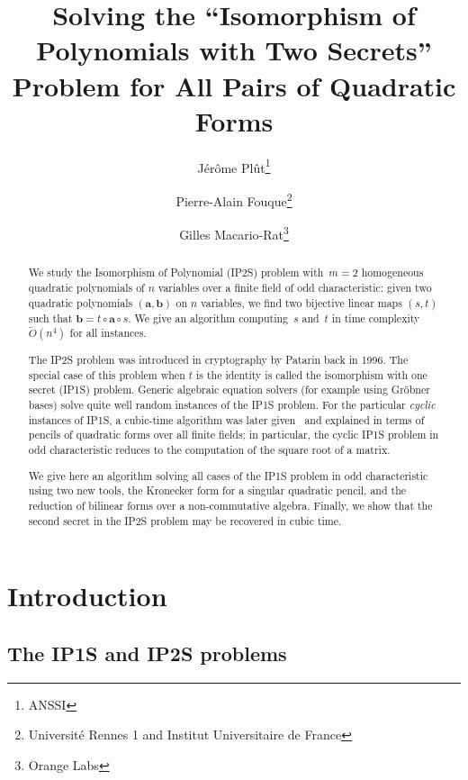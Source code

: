 \documentclass{article}%
\def\Ot{\widetilde{O}}
\begin{document}
\title%
{Solving the ``Isomorphism of Polynomials with Two Secrets'' Problem
for All Pairs of Quadratic Forms}%
\author{Jérôme Plût\footnote{ANSSI}
\and Pierre-Alain Fouque\footnote{Université Rennes 1 and Institut
Universitaire de France}
\and Gilles Macario-Rat\footnote{Orange Labs}}
\maketitle

\begin{abstract}%
We study the Isomorphism of Polynomial (IP2S) problem
with~$m=2$ homogeneous quadratic polynomials of $n$ variables over a finite field of odd
characteristic: given two quadratic polynomials $(\bm{a},\bm{b})$ 
on $n$ variables, we find two bijective linear maps $(s,t)$ such that
$\bm{b}=t\circ \bm{a}\circ s$. We give an algorithm computing~$s$ and~$t$
in time complexity~$\Ot(n^4)$ for all instances.

The IP2S problem was introduced in cryptography by Patarin back in 1996.
The special case of this problem when $t$ is the identity is called
the isomorphism with one secret (IP1S) problem.
Generic algebraic equation solvers (for example using Gröbner bases)
solve quite well random instances of the IP1S problem. For the particular
\emph{cyclic} instances of IP1S, a cubic-time algorithm was later
given~\cite{MPG2013} and explained in terms of pencils of quadratic forms
over all finite fields; in particular, the cyclic IP1S problem in odd
characteristic reduces to the computation of the square root of a matrix.

We give here an algorithm solving all cases of the IP1S problem in odd
characteristic using two new tools, the Kronecker form for a singular
quadratic pencil, and the reduction of bilinear forms over a non-commutative
algebra. Finally, we show that the second secret in the IP2S problem may
be recovered in cubic time.
\end{abstract}%
\section*{Introduction}%
\subsection*{The IP1S and IP2S problems}%
\end{document}
